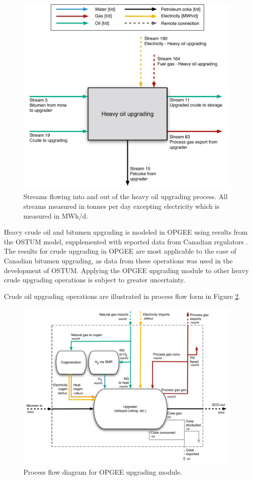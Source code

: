 \documentclass[11pt]{report}
\begin{document}
\begin{figure}
\includegraphics[width=0.85\columnwidth]{images/Heavy_oil_upgrading_PF.pdf}
\caption{Streams flowing into and out of the heavy oil upgrading process. All streams measured in tonnes per day excepting electricity which is measured in MWh/d.}
\label{fig:heavy_oil_upgrading_PF}
\end{figure}


Heavy crude oil and bitumen upgrading is modeled in OPGEE using results from the OSTUM model, supplemented with reported data from Canadian regulators \cite{OSTUM2016}. The results for crude upgrading in OPGEE are most applicable to the case of Canadian bitumen upgrading, as data from these operations was used in the development of OSTUM. Applying the OPGEE upgrading module to other heavy crude upgrading operations is subject to greater uncertainty.

Crude oil upgrading operations are illustrated in process flow form in Figure \ref{fig:upgrading}.


\begin{landscape}

\begin{figure}[t]
\includegraphics[width=.8\columnwidth]{images/Upgrading.pdf}
\caption{Process flow diagram for OPGEE upgrading module.}
\label{fig:upgrading}
\end{figure}

\end{landscape}
\end{document}

